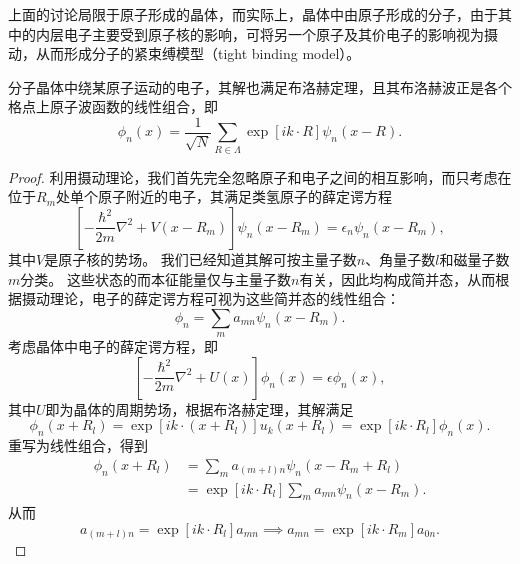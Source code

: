 上面的讨论局限于原子形成的晶体，而实际上，晶体中由原子形成的分子，由于其中的内层电子主要受到原子核的影响，可将另一个原子及其价电子的影响视为摄动，从而形成分子的紧束缚模型（tight binding model）。
\begin{proposition}
    分子晶体中绕某原子运动的电子，其解也满足布洛赫定理，且其布洛赫波正是各个格点上原子波函数的线性组合，即
    \begin{equation}
        \phi_n(x) = \frac{1}{\sqrt N} \sum_{R \in \Lambda} \exp[ik\cdot R] \psi_n(x - R).
    \end{equation}
\end{proposition}
\begin{proof}
    利用摄动理论，我们首先完全忽略原子和电子之间的相互影响，而只考虑在位于$R_m$处单个原子附近的电子，其满足类氢原子的薛定谔方程
    \begin{equation}
        \left[- \frac{\hbar^2}{2m} \nabla^2 + V(x - R_m)\right] \psi_n(x - R_m) = \epsilon_n \psi_n(x - R_m),
    \end{equation}
    其中$V$是原子核的势场。
    我们已经知道其解可按主量子数$n$、角量子数$l$和磁量子数$m$分类。
    这些状态的而本征能量仅与主量子数$n$有关，因此均构成简并态，从而根据摄动理论，电子的薛定谔方程可视为这些简并态的线性组合：
    \begin{equation}
        \phi_n = \sum_m a_{mn} \psi_n(x - R_m).
    \end{equation}
    考虑晶体中电子的薛定谔方程，即
    \begin{equation}
        \left[- \frac{\hbar^2}{2m} \nabla^2 + U(x)\right] \phi_n(x) = \epsilon \phi_n(x),
    \end{equation}
    其中$U$即为晶体的周期势场，根据布洛赫定理，其解满足
    \begin{equation}
        \phi_n(x + R_l) = \exp[ik\cdot(x + R_l)] u_k(x + R_l) = \exp[ik \cdot R_l] \phi_n(x).
    \end{equation}
    重写为线性组合，得到
    \begin{equation}
        \begin{aligned}
            \phi_n(x + R_l) &= \sum_m a_{(m+l)n} \psi_n(x - R_m + R_l) \\
            &= \exp[ik \cdot R_l] \sum_m a_{mn} \psi_n(x - R_m).
        \end{aligned}
    \end{equation}
    从而
    \begin{equation}
        a_{(m+l)n} = \exp[ik\cdot R_l] a_{mn} \implies a_{mn} = \exp[ik \cdot R_m] a_{0n}.
    \end{equation}

\end{proof}
